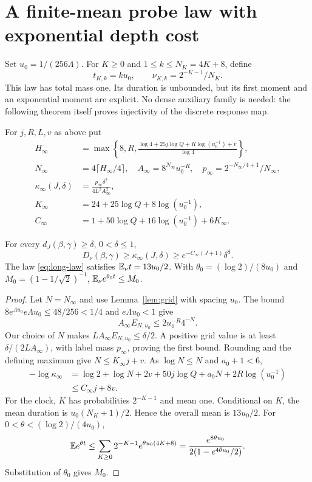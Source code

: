 \section{A finite-mean probe law with exponential depth cost}
\label{sec:long}
Set $u_0=1/(256\Lambda)$. For $K\ge0$ and $1\le k\le N_K=4K+8$, define
\begin{equation}
 t_{K,k}=ku_0,\qquad \nu_{K,k}=2^{-K-1}/N_K.
 \label{eq:long-law}
\end{equation}
This law has total mass one. Its duration is unbounded, but its first moment
and an exponential moment are explicit. No dense auxiliary family is needed:
the following theorem itself proves injectivity of the discrete response map.

For $j,R,L,v$ as above put
\begin{equation}
\begin{split}
 H_\infty&=\max\left\{8,R,
 \frac{\log4+25j\log Q+R\log(u_0^{-1})+v}{\log4}\right\},\\
 N_\infty&=4\lceil H_\infty/4\rceil,\quad
 A_\infty=8^{N_\infty}u_0^{-R},\quad
 p_\infty=2^{-N_\infty/4+1}/N_\infty,\\
 \kappa_\infty(J,\delta)&=\frac{p_\infty\delta^2}{4L^2A_\infty^2},\\
 K_\infty&=24+25\log Q+8\log(u_0^{-1}),\\
 C_\infty&=1+50\log Q+16\log(u_0^{-1})+6K_\infty.
\end{split}\label{eq:long-certificate}
\end{equation}

\begin{theorem}
\label{thm:long}
For every $d_J(\beta,\gamma)\ge\delta$, $0<\delta\le1$,
\begin{equation}
 D_\nu(\beta,\gamma)\ge\kappa_\infty(J,\delta)
 \ge e^{-C_\infty(J+1)}\delta^8.
 \label{eq:long-separation}
\end{equation}
The law \eqref{eq:long-law} satisfies $\mathbb E_\nu t=13u_0/2$. With
$\theta_0=(\log2)/(8u_0)$ and $M_0=(1-1/\sqrt2)^{-1}$,
$\mathbb E_\nu e^{\theta_0t}\le M_0$.
\end{theorem}
\begin{proof}
Let $N=N_\infty$ and use Lemma~\ref{lem:grid} with spacing $u_0$. The bound
$8e^{\Lambda u_0}e\Lambda u_0\le48/256<1/4$ and $e\Lambda u_0<1$ give
\[
 A_\infty E_{N,u_0}\le 2u_0^{-R}4^{-N}.
\]
Our choice of $N$ makes $LA_\infty E_{N,u_0}\le\delta/2$. A positive grid
value is at least $\delta/(2LA_\infty)$, with label mass $p_\infty$, proving
the first bound. Rounding and the defining maximum give
$N\le K_\infty j+v$. As $\log N\le N$ and $a_0+1<6$,
\begin{align*}
 -\log\kappa_\infty
 &=\log2+\log N+2v+50j\log Q+a_0N+2R\log(u_0^{-1})\\
 &\le C_\infty j+8v.
\end{align*}
For the clock, $K$ has probabilities $2^{-K-1}$ and mean one. Conditional on
$K$, the mean duration is $u_0(N_K+1)/2$. Hence the overall mean is
$13u_0/2$. For $0<\theta<(\log2)/(4u_0)$,
\[
 \mathbb E e^{\theta t}\le\sum_{K\ge0}2^{-K-1}e^{\theta u_0(4K+8)}
 =\frac{e^{8\theta u_0}}{2(1-e^{4\theta u_0}/2)}.
\]
Substitution of $\theta_0$ gives $M_0$.
\end{proof}

